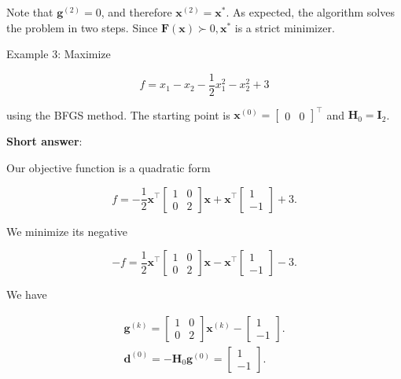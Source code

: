 Note that \(\boldsymbol{g}^{(2)}=0\), and therefore \(\boldsymbol{x}^{(2)}=\boldsymbol{x}^{*}\). As expected, the algorithm solves the problem in two steps. Since \(\boldsymbol{F}(\boldsymbol{x}) \succ 0, \boldsymbol{x}^{*}\) is a strict minimizer.

\medskip

Example 3: Maximize

\[
	f=x_{1}-x_{2}-\frac{1}{2} x_{1}^{2}-x_{2}^{2}+3
\]

using the BFGS method. The starting point is \(\boldsymbol{x}^{(0)}=\left[\begin{array}{ll}0 & 0\end{array}\right]^{\top}\) and \(\boldsymbol{H}_{0}=\boldsymbol{I}_{2}\).

\textbf{Short answer}:

Our objective function is a quadratic form

\[
	f=-\frac{1}{2} \boldsymbol{x}^{\top}\left[\begin{array}{ll}
		1 & 0 \\
		0 & 2
	\end{array}\right] \boldsymbol{x}+\boldsymbol{x}^{\top}\left[\begin{array}{c}
		1 \\
		-1
	\end{array}\right]+3 .
\]

We minimize its negative

\[
	-f=\frac{1}{2} \boldsymbol{x}^{\top}\left[\begin{array}{ll}
		1 & 0 \\
		0 & 2
	\end{array}\right] \boldsymbol{x} - \boldsymbol{x}^{\top}\left[\begin{array}{c}
		1 \\
		-1
	\end{array}\right]-3 .
\]

We have

\[
	\begin{gathered}
		\boldsymbol{g}^{(k)}=\left[\begin{array}{ll}
			1 & 0 \\
			0 & 2
		\end{array}\right] \boldsymbol{x}^{(k)}-\left[\begin{array}{c}
			1 \\
			-1
		\end{array}\right] . \\
		\boldsymbol{d}^{(0)}=-\boldsymbol{H}_{0} \boldsymbol{g}^{(0)}=\left[\begin{array}{c}
			1 \\
			-1
		\end{array}\right] .
	\end{gathered}
\]

